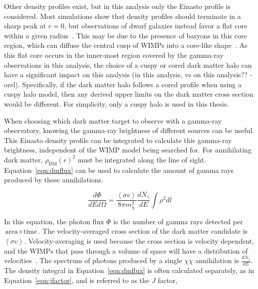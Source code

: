     Other density profiles exist, but in this analysis only the Einasto profile is considered.
    Most simulations show that density profiles should terminate in a sharp peak at $r=0$, but observations of dwarf galaxies instead favor a flat core within a given radius~\cite{flores1994observational,CoreVsCusp}.
    This may be due to the presence of baryons in this core region, which can diffuse the central cusp of WIMPs into a core-like shape~\cite{corecusp_baryondiffuse1,corecusp_baryondiffuse2}.
    As this flat core occurs in the inner-most region covered by the gamma-ray observations {\color{red}in this analysis}, the choice of a cuspy or cored dark matter halo can have a significant impact {\color{red}on this analysis} {\color{red}(in this analysis, vs on this analysis?? -orel)}.
    Specifically, if the dark matter halo follows a cored profile when using a cuspy halo model, then any derived upper limits on the dark matter cross section would be different.
    For simplicity, only a cuspy halo is used in this thesis.
    
    When choosing which dark matter target to observe with a gamma-ray observatory, knowing the gamma-ray brightness of different sources can be useful.
    This Einasto density profile can be integrated to calculate this gamma-ray brightness, independent of the WIMP model being searched for.
    For annihilating dark matter, $\rho_{\textrm{DM}}\left(r\right)^2$ must be integrated along the line of sight.
    Equation~\ref{eqn:dmflux} can be used to calculate the amount of gamma rays produced by these annihilations.
    
    \begin{equation}\label{eqn:dmflux}
      \frac{ d\Phi }{ dE d \Omega } = \frac{ \left \langle \sigma v \right \rangle }{8 \pi m_\chi^2} \frac{dN_{\gamma}}{dE} \int \rho^2 dl
    \end{equation}
    
    In this equation, the photon flux $\Phi$ is the number of gamma rays detected per $\textrm{area}\times\textrm{time}$.
    The velocity-averaged cross section of the dark matter candidate is $\left \langle \sigma v \right \rangle$.
    Velocity-averaging is used because the cross section is velocity dependent, and the WIMPs that pass through a volume of space will have a distribution of velocities~\cite{wimp_veldist}.
    The spectrum of photons produced by a single $\chi\chi$ annihilation is $\frac{dN_{\gamma}}{dE}$.
    The density integral in Equation~\ref{eqn:dmflux} is often calculated separately, as in Equation~\ref{eqn:jfactor}, and is referred to as the $J$ factor,


